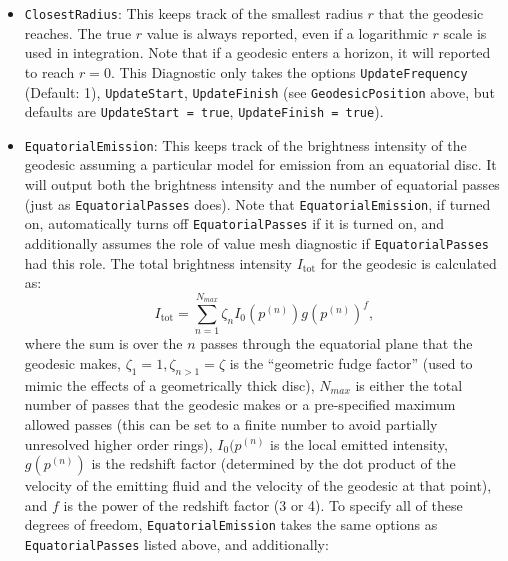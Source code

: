 \documentclass[11pt,a4paper]{article}
\newcommand{\be}{\begin{equation}}
\newcommand{\ee}{\end{equation}}
\newcommand{\code}[1]{{\tt #1}}
\begin{document}
\begin{itemize}
\begin{itemize}
\item \code{Threshold = real;} \newline Only consider a geodesic ``above'' or ``below'' the equatorial plane if its $\theta$ coordinate is \code{Threshold}$\times\pi/2$ above or below $\pi/2$. This threshold is mainly useful for (near-)equatorial camera positions, since in that case without a threshold there is often a discontinuity in equatorial passes between the top and bottom half of the screen. (Default is 0.01.)
\end{itemize}
\item \code{ClosestRadius}: This keeps track of the smallest radius $r$ that the geodesic reaches. The true $r$ value is always reported, even if a logarithmic $r$ scale is used in integration. Note that if a geodesic enters a horizon, it will reported to reach $r=0$. This Diagnostic only takes the options \code{UpdateFrequency} (Default: 1), \code{UpdateStart}, \code{UpdateFinish} (see \code{GeodesicPosition} above, but defaults are \code{UpdateStart = true}, \code{UpdateFinish = true}).
\item \code{EquatorialEmission}: This keeps track of the brightness intensity of the geodesic assuming a particular model for emission from an equatorial disc. It will output both the brightness intensity and the number of equatorial passes (just as \code{EquatorialPasses} does). Note that \code{EquatorialEmission}, if turned on, automatically turns off \code{EquatorialPasses} if it is turned on, and additionally assumes the role of value mesh diagnostic if \code{EquatorialPasses} had this role.
The total brightness intensity $I_\text{tot}$ for the geodesic is calculated as:
\be I_\text{tot} = \sum_{n=1}^{N_{max}} \zeta_n I_0(p^{(n)}) g(p^{(n)})^f,\ee
where the sum is over the $n$ passes through the equatorial plane that the geodesic makes, 
%
$\zeta_1=1, \zeta_{n>1}=\zeta$ is the ``geometric fudge factor'' (used to mimic the effects of a geometrically thick disc),
%
$N_{max}$ is either the total number of passes that the geodesic makes or a pre-specified maximum allowed passes (this can be set to a finite number to avoid partially unresolved higher order rings), 
%
$I_0(p^{(n)}$ is the local emitted intensity,
%
$g(p^{(n)})$ is the redshift factor (determined by the dot product of the velocity of the emitting fluid and the velocity of the geodesic at that point),
%
and $f$ is the power of the redshift factor (3 or 4). To specify all of these degrees of freedom, 
\code{EquatorialEmission} takes the same options as \code{EquatorialPasses} listed above, and additionally:

\end{itemize}
\end{document}

